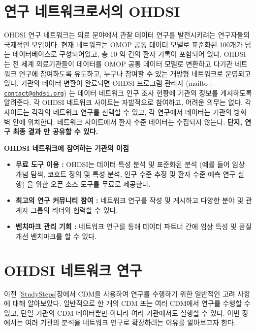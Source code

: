 \documentclass[11pt]{book}
\providecommand{\tightlist}{%
  \setlength{\itemsep}{0pt}\setlength{\parskip}{0pt}}
\theoremstyle{definition}
\theoremstyle{definition}
\theoremstyle{definition}
\theoremstyle{remark}
\let\BeginKnitrBlock\begin \let\EndKnitrBlock\end
\begin{document}
\section{연구 네트워크로서의 OHDSI}\label{--ohdsi}


OHDSI 연구 네트워크는 의료 분야에서 관찰 데이터 연구를 발전시키려는
연구자들의 국제적인 모임이다. 현재 네트워크는 OMOP 공통 데이터 모델로
표준화된 100개가 넘는 데이터베이스로 구성되어있고, 총 10 억 건의 환자
기록이 포함되어 있다. OHDSI는 전 세계 의료기관들이 데이터를 OMOP 공통
데이터 모델로 변환하고 다기관 네트워크 연구에 참여하도록 유도하고,
누구나 참여할 수 있는 개방형 네트워크로 운영되고 있다. 기관의 데이터
변환이 완료되면 OHDSI 프로그램 관리자 (mailto :
\href{mailto:contact@ohdsi.org}{\nolinkurl{contact@ohdsi.org}}) 는
데이터 네트워크 인구 조사 현황에 기관의 정보를 게시하도록 알려준다. 각
OHDSI 네트워크 사이트는 자발적으로 참여하고, 어려운 의무는 없다. 각
사이트는 각각의 네트워크 연구를 선택할 수 있고, 각 연구에서 데이터는
기관의 방화벽 안에 위치한다. 네트워크 사이트에서 환자 수준 데이터는
수집되지 않는다. \textbf{단지, 연구 최종 결과 만 공유할 수 있다.}

\BeginKnitrBlock{rmdimportant}
\textbf{OHDSI 네트워크에 참여하는 기관의 이점}

\begin{itemize}
\tightlist
\item
  \textbf{무료 도구 이용 :} OHDSI는 데이터 특성 분석 및 표준화된 분석
  (예를 들어 임상 개념 탐색, 코호트 정의 및 특성 분석, 인구 수준 추정 및
  환자 수준 예측 연구 실행) 을 위한 오픈 소스 도구를 무료로 제공한다.
\item
  \textbf{최고의 연구 커뮤니티 참여 :} 네트워크 연구를 작성 및 게시하고
  다양한 분야 및 관계자 그룹의 리더와 협력할 수 있다.
\item
  \textbf{벤치마크 관리 기회 :} 네트워크 연구를 통해 데이터 파트너 간에
  임상 특성 및 품질 개선 벤치마크를 할 수 있다.
\end{itemize}
\EndKnitrBlock{rmdimportant}

\section{OHDSI 네트워크 연구}\label{ohdsi--}


이전 \ref{StudySteps}장에서 CDM을 사용하여 연구를 수행하기 위한 일반적인
고려 사항에 대해 알아보았다. 일반적으로 한 개의 CDM 또는 여러 CDM에서
연구를 수행할 수 있고, 단일 기관의 CDM 데이터뿐만 아니라 여러 기관에서도
실행할 수 있다. 이번 장에서는 여러 기관의 분석을 네트워크 연구로
확장하려는 이유를 알아보고자 한다.
\end{document}

